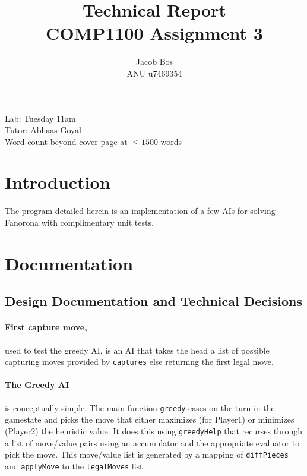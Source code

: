 \documentclass[11pt]{article}
\title{Technical Report\\ COMP1100 Assignment 3}
\author{Jacob Bos\\ ANU u7469354}
\begin{document}
\maketitle
{}
\begin{center}
  Lab: Tuesday 11am\\
  Tutor: Abhaas Goyal\\
  Word-count beyond cover page at $\leq 1500$ words
\end{center}
\tableofcontents
\newpage
{}
\section{Introduction} 
The program detailed herein is an implementation of a few AIs for solving Fanorona with complimentary unit tests.


\section{Documentation}%
\subsection*{Design Documentation and Technical Decisions}
\paragraph*{First capture move,} used to test the greedy AI, is an AI that takes the head a list of possible capturing moves provided by \verb|captures| else returning the first legal move.

\paragraph{The Greedy AI} is conceptually simple. The main function \verb|greedy| cases on the turn in the gamestate and picks the move that either maximizes (for Player1) or minimizes (Player2) the heuristic value. It does this using \verb|greedyHelp| that recurses through a list of move/value pairs using an accumulator and the appropriate evaluator to pick the move. This move/value list is generated by a mapping of \verb|diffPieces| and \verb|applyMove| to the \verb|legalMoves| list.
\end{document}
